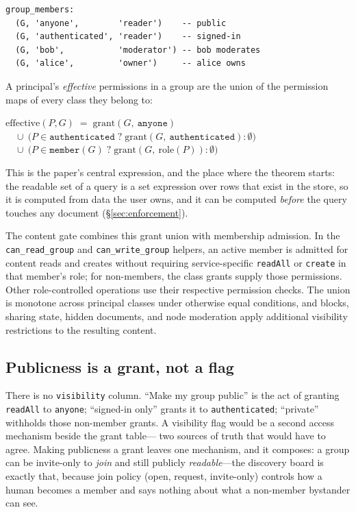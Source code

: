 \documentclass[sigconf, nonacm]{acmart}
\begin{document}
\begin{lstlisting}[style=sql]
group_members:
  (G, 'anyone',        'reader')    -- public
  (G, 'authenticated', 'reader')    -- signed-in
  (G, 'bob',           'moderator') -- bob moderates
  (G, 'alice',         'owner')     -- alice owns
\end{lstlisting}

A principal's \emph{effective} permissions in a group are the union of the
permission maps of every class they belong to:

\begin{center}
\small
$\mathrm{effective}(P, G) \;=\; \mathrm{grant}(G,\ \texttt{anyone})$\\
$\quad \cup\ \big(P \in \texttt{authenticated} \;?\; \mathrm{grant}(G,\ \texttt{authenticated}) : \emptyset\big)$\\
$\quad \cup\ \big(P \in \texttt{member}(G) \;?\; \mathrm{grant}(G,\ \mathrm{role}(P)) : \emptyset\big)$
\end{center}

This is the paper's central expression, and the place where the theorem
starts: the readable set of a query is a set expression over rows that exist
in the store, so it is computed from data the user owns, and it can be
computed \emph{before} the query touches any document
(\S\ref{sec:enforcement}).

The content gate combines this grant union with membership admission. In the
\texttt{can\_read\_group} and \texttt{can\_write\_group} helpers, an active
member is admitted for content reads and creates without requiring
service-specific \texttt{readAll} or \texttt{create} in that member's role;
for non-members, the class grants supply those permissions. Other
role-controlled operations use their respective permission checks. The union
is monotone across principal classes under otherwise equal conditions, and
blocks, sharing state, hidden documents, and node moderation apply additional
visibility restrictions to the resulting content.

\subsection{Publicness is a grant, not a flag}

There is no \texttt{visibility} column. ``Make my group public'' is the act
of granting \texttt{readAll} to \texttt{anyone}; ``signed-in only'' grants it
to \texttt{authenticated}; ``private'' withholds those non-member grants. A
visibility flag would be a second access mechanism beside the grant table---
two sources of truth that would have to agree. Making publicness a grant
leaves one mechanism, and it composes: a group can be invite-only to
\emph{join} and still publicly \emph{readable}---the discovery board is
exactly that, because join policy (open, request, invite-only) controls how
a human becomes a member and says nothing about what a non-member bystander
can see.
\end{document}
